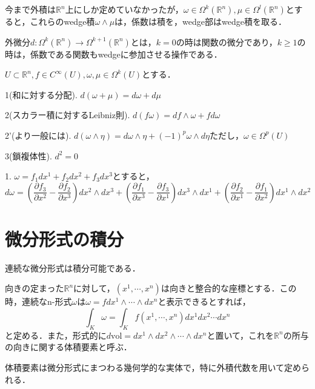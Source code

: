 \documentclass[uplatex, dvipdfmx]{jsreport}
\begin{document}
\begin{definition}
    今まで外積は$\mathbb{R}^n$上にしか定めていなかったが，$\omega\in\Omega^k(\mathbb{R}^n),\mu\in\Omega^l(\mathbb{R}^n)$とすると，これらのwedge積$\omega\wedge\mu$は，係数は積を，wedge部はwedge積を取る．
\end{definition}

\begin{definition}
    外微分$d:\Omega^k(\mathbb{R}^n)\to\Omega^{k+1}(\mathbb{R}^n)$とは，$k=0$の時は関数の微分であり，$k\ge 1$の時は，係数である関数もwedgeに参加させる操作である．
\end{definition}

\begin{lemma}[外微分の性質]
    $U\subset\mathbb{R}^n,f\in C^\infty(U),\omega,\mu\in\Omega^k(U)$とする．

    1(和に対する分配). $d(\omega+\mu)=d\omega+d\mu$

    2(スカラー積に対するLeibniz則). $d(f\omega)=df\wedge\omega+fd\omega$

    2'(より一般には). $d(\omega\wedge\eta)=d\omega\wedge\eta+(-1)^p\omega\wedge d\eta$ただし，$\omega\in\Omega^p(U)$

    3(鎖複体性). $d^2=0$
\end{lemma}

\begin{example}[外微分の計算例]
    1. $\omega=f_1dx^1+f_2dx^2+f_3dx^3$とすると，
    \[d\omega=\left(\frac{\partial f_3}{\partial x^2}-\frac{\partial f_2}{\partial x^3}\right)dx^2\wedge dx^3 + \left(\frac{\partial f_1}{\partial x^3}-\frac{\partial f_3}{\partial x^1}\right)dx^3\wedge dx^1 + \left(\frac{\partial f_2}{\partial x^1}-\frac{\partial f_1}{\partial x^2}\right)dx^1\wedge dx^2 \]
\end{example}

\section{微分形式の積分}
連続な微分形式は積分可能である．

\begin{definition}[微分形式の積分]
    向きの定まった$\mathbb{R}^n$に対して，$(x^1,\cdots,x^n)$は向きと整合的な座標とする．この時，連続なn-形式$\omega$は$\omega=fdx^1\wedge\cdots\wedge dx^n$と表示できるとすれば，
    \[\int_K\omega=\int_Kf(x^1,\cdots,x^n)dx^1dx^2\cdots dx^n\]
    と定める．また，形式的に$d\mathrm{vol}=dx^1\wedge dx^2\wedge\cdots\wedge dx^n$と置いて，これを$\mathbb{R}^n$の所与の向きに関する体積要素と呼ぶ．
\end{definition}
\begin{remark*}
    体積要素は微分形式にまつわる幾何学的な実体で，特に外積代数を用いて定められる．
\end{remark*}
\end{document}
